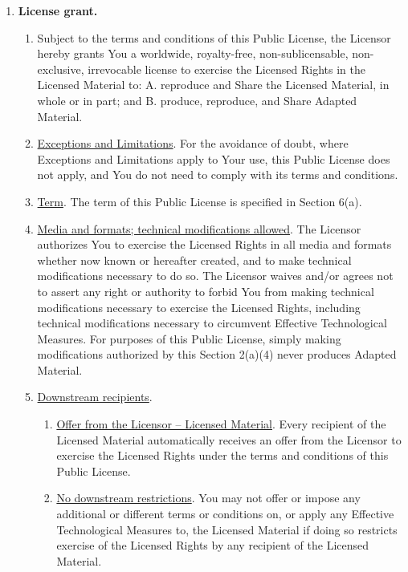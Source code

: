 \begin{enumerate}[label=\alph*.]
  \item \textbf{License grant.}
    \begin{enumerate}[label=\arabic*.]
      \item Subject to the terms and conditions of this Public License, the Licensor hereby grants You a worldwide, royalty-free, non-sublicensable, non-exclusive, irrevocable license to exercise the Licensed Rights in the Licensed Material to:
          A. reproduce and Share the Licensed Material, in whole or in part; and
          B. produce, reproduce, and Share Adapted Material.

      \item \underline{Exceptions and Limitations}. For the avoidance of doubt, where Exceptions and Limitations apply to Your use, this Public License does not apply, and You do not need to comply with its terms and conditions.

      \item \underline{Term}. The term of this Public License is specified in Section 6(a).

      \item \underline{Media and formats; technical modifications allowed}. The Licensor authorizes You to exercise the Licensed Rights in all media and formats whether now known or hereafter created, and to make technical modifications necessary to do so. The Licensor waives and/or agrees not to assert any right or authority to forbid You from making technical modifications necessary to exercise the Licensed Rights, including technical modifications necessary to circumvent Effective Technological Measures. For purposes of this Public License, simply making modifications authorized by this Section 2(a)(4) never produces Adapted Material.

      \item \underline{Downstream recipients}.

        \begin{enumerate}[label=\Alph*.]
          \item \underline{Offer from the Licensor – Licensed Material}. Every recipient of the Licensed Material automatically receives an offer from the Licensor to exercise the Licensed Rights under the terms and conditions of this Public License.

          \item \underline{No downstream restrictions}. You may not offer or impose any additional or different terms or conditions on, or apply any Effective Technological Measures to, the Licensed Material if doing so restricts exercise of the Licensed Rights by any recipient of the Licensed Material.
        \end{enumerate}


\end{enumerate}
\end{enumerate}
